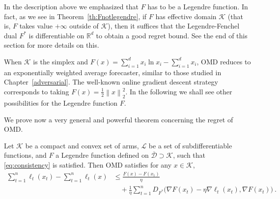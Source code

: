\documentclass[11pt]{hackednow}
\newcommand{\R}{\mathbb{R}}
\newcommand{\cL}{\mathcal{L}}
\newcommand{\cK}{\mathcal{K}}
\newcommand{\oD}{\overline{\mathcal{D}}}
\newcommand{\norm}[1]{\left\|{#1}\right\|}
\begin{document}
In the description above we emphasized that $F$ has to be a Legendre function. In fact, as we see in Theorem~\ref{th:Fnotlegendre}, if $F$ has effective domain $\cK$ (that is, $F$ takes value $+\infty$ outside of $\cK$), then it suffices that the Legendre-Fenchel dual $F^*$ is differentiable on $\R^d$ to obtain a good regret bound. See the end of this section for more details on this.

When $\cK$ is the simplex and $F(x) = \sum_{i=1}^d x_i \ln x_i - \sum_{i=1}^d x_i$, OMD reduces to 
an exponentially weighted average forecaster, similar to those studied in Chapter~\ref{adversarial}. The well-known online gradient descent strategy corresponds to taking $F(x) = \frac12 \norm{x}^2_2$. In the following we shall see other possibilities for the Legendre function $F$.

We prove now a very general and powerful theorem concerning the regret of OMD.
%
\begin{theorem} \label{th:MGD}
Let $\cK$ be a compact and convex set of arms, $\cL$ be a set of subdifferentiable functions, and $F$ a Legendre function defined on $\oD \supset \cK$, such that \eqref{eq:consistency} is satisfied. Then OMD satisfies for any $x \in \cK$,
\begin{align*}
\sum_{t=1}^n \ell_t(x_t) - \sum_{t=1}^n \ell_t(x)
& \leq \frac{F(x) - F(x_1)}{\eta} \\
&  \quad + \frac{1}{\eta} \sum_{t=1}^n D_{F^*}\bigg(\nabla F(x_t) - \eta \nabla \ell_t(x_t), \nabla F(x_t)\bigg)~.
\end{align*}
\end{theorem}
%
\end{document}
